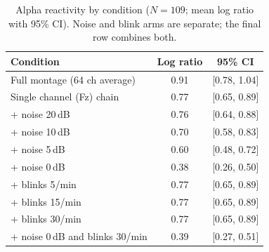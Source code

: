 \begin{table}[t]
  \centering
  \caption{Alpha reactivity by condition ($N=109$; mean log ratio with 95\% CI). Noise
  and blink arms are separate; the final row combines both.}
  \label{tab:alpha}
  \begin{tabular}{lcc}
    \hline
    Condition & Log ratio & 95\% CI \\
    \hline
    Full montage (64 ch average) & 0.91 & [0.78, 1.04] \\
    Single channel (Fz) chain & 0.77 & [0.65, 0.89] \\
    + noise 20\,dB & 0.76 & [0.64, 0.88] \\
    + noise 10\,dB & 0.70 & [0.58, 0.83] \\
    + noise 5\,dB & 0.60 & [0.48, 0.72] \\
    + noise 0\,dB & 0.38 & [0.26, 0.50] \\
    + blinks 5/min & 0.77 & [0.65, 0.89] \\
    + blinks 15/min & 0.77 & [0.65, 0.89] \\
    + blinks 30/min & 0.77 & [0.65, 0.89] \\
    + noise 0\,dB and blinks 30/min & 0.39 & [0.27, 0.51] \\
    \hline
  \end{tabular}
\end{table}
